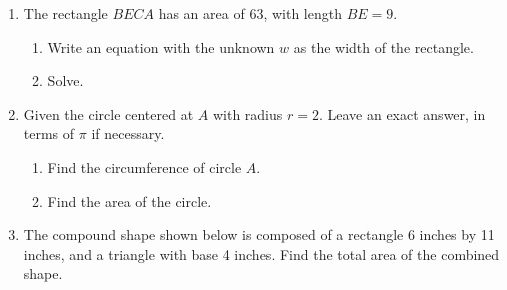 \begin{enumerate}
\item The rectangle $BECA$ has an area of 63, with length $BE=9$.
\begin{enumerate}
  \item Write an equation with the unknown $w$ as the width of the rectangle.\\[0.5cm]
  \item Solve.
\end{enumerate}
\begin{flushright}
\end{flushright}

\item Given the circle centered at $A$ with radius $r=2$. Leave an exact answer, in terms of $\pi$ if necessary.
  \begin{multicols}{2}
    \begin{enumerate}
      \item Find the circumference of circle $A$. %
      \item Find the area of the circle.\vspace{2cm}
    \end{enumerate}
    \begin{flushright}
  \end{flushright}
  \end{multicols}

\item The compound shape shown below is composed of a rectangle 6 inches by 11 inches, and a triangle with base 4 inches. Find the total area of the combined shape.
    \vspace{0.5cm} 
    \begin{flushleft}
    \end{flushleft}




\end{enumerate}

